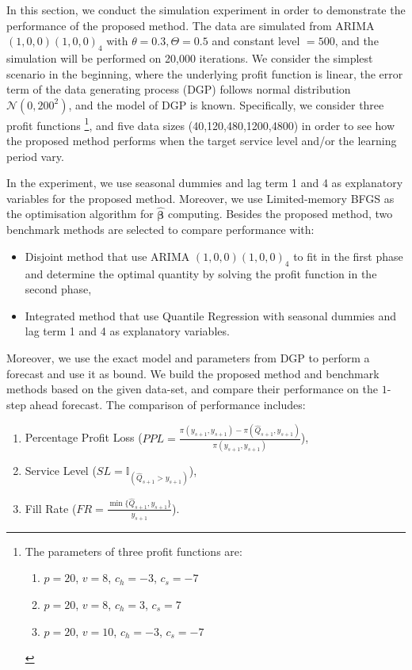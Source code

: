 \documentclass{article}
\begin{document}
In this section, we conduct the simulation experiment in order to demonstrate the performance of the proposed method. The data are simulated from ARIMA $(1,0,0)(1,0,0)_4$ with $\theta=0.3,\Theta=0.5$ and constant level $=500$, and the simulation will be performed on 20,000 iterations. We consider the simplest scenario in the beginning, where the underlying profit function is linear, the error term of the data generating process (DGP) follows normal distribution $\mathcal{N}(0,200^2)$, and the model of DGP is known. Specifically, we consider three profit functions \footnote{
The parameters of three profit functions are:
\begin{enumerate}
    \item $p=20$, $v=8$, $c_h=-3$, $c_s=-7$
    \item $p=20$, $v=8$, $c_h=3$, $c_s=7$
    \item $p=20$, $v=10$, $c_h=-3$, $c_s=-7$
\end{enumerate}
}, and five data sizes (40,120,480,1200,4800) in order to see how the proposed method performs when the target service level and/or the learning period vary.

In the experiment, we use seasonal dummies and lag term 1 and 4 as explanatory variables for the proposed method. Moreover, we use Limited-memory BFGS \cite{LN89} as the optimisation algorithm for $\hat{\boldsymbol{\beta}}$ computing. Besides the proposed method, two benchmark methods are selected to compare performance with:
\begin{itemize}
    \item Disjoint method that use ARIMA $(1,0,0)(1,0,0)_4$ to fit in the first phase and determine the optimal quantity by solving the profit function in the second phase,
    \item Integrated method that use Quantile Regression with seasonal dummies and lag term 1 and 4 as explanatory variables.
\end{itemize}
Moreover, we use the exact model and parameters from DGP to perform a forecast and use it as bound. We build the proposed method and benchmark methods based on the given data-set, and compare their performance on the $1$-step ahead forecast. The comparison of performance includes:
\begin{enumerate}
    \item Percentage Profit Loss ($PPL=\frac{\pi(y_{s+1},y_{s+1})-\pi(\hat{Q}_{s+1},y_{s+1})}{\pi(y_{s+1},y_{s+1})}$),
    \item Service Level ($SL=\mathbb {I}_{(\hat{Q}_{s+1}>y_{s+1})}$),
    \item Fill Rate ($FR=\frac{\min\{\hat{Q}_{s+1},y_{s+1}\}}{y_{s+1}}$).
\end{enumerate}
\end{document}
